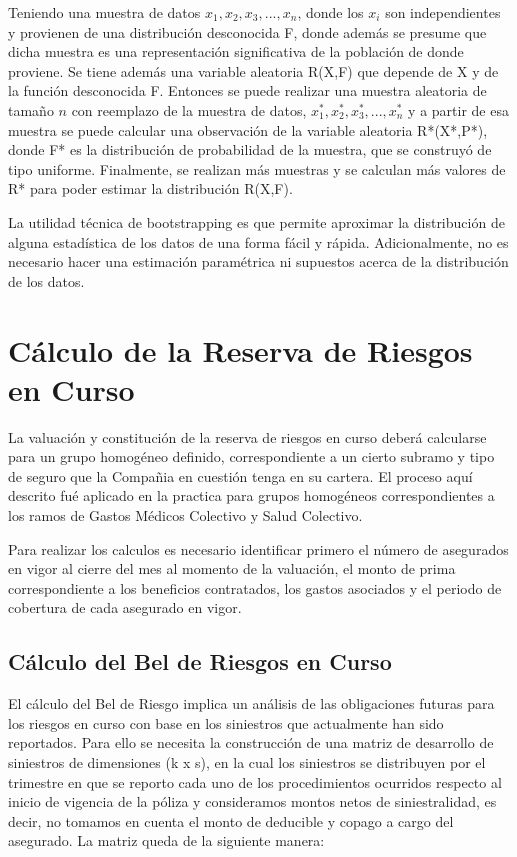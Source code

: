 \documentclass[11pt,twoside,openright,spanish]{report}
\numberwithin{equation}{chapter}
\numberwithin{figure}{chapter}
\numberwithin{table}{chapter}
\begin{document}
	Teniendo una muestra de datos $x_{1},x_{2},x_{3},...,x_{n}$, donde los $x_{i}$ son independientes y provienen de una distribución desconocida F, donde además se presume que dicha muestra es una representación significativa de la población de donde proviene. Se tiene además una variable aleatoria R(X,F) que depende de X y de la función desconocida F. Entonces se puede realizar una muestra aleatoria de tamaño $n$ con reemplazo de la muestra de datos, $x_{1}^{*},x_{2}^{*},x_{3}^{*},...,x_{n}^{*}$ y a partir de esa muestra se puede calcular una observación de la variable aleatoria R*(X*,P*), donde F* es la distribución de probabilidad de la muestra, que se construyó de tipo uniforme. Finalmente, se realizan más muestras y se calculan más valores de R* para poder estimar la distribución R(X,F).

	La utilidad técnica de bootstrapping es que permite aproximar la distribución de alguna estadística de los datos de una forma fácil y rápida. Adicionalmente, no es necesario hacer una estimación paramétrica ni supuestos acerca de la distribución de los datos.

	\chapter{Cálculo de la Reserva de Riesgos en Curso}\label{metnum}
	
	La valuación y constitución de la reserva de riesgos en curso deberá calcularse para un grupo homogéneo definido, correspondiente a un cierto subramo y tipo de seguro que la Compañia en cuestión tenga en su cartera. El proceso aquí descrito fué aplicado en la practica para grupos homogéneos correspondientes a los ramos de Gastos Médicos Colectivo y Salud Colectivo.
	
	Para realizar los calculos es necesario identificar primero el número de asegurados en vigor al cierre del mes al momento de la valuación, el monto de prima correspondiente a los beneficios contratados, los gastos asociados y el periodo de cobertura de cada asegurado en vigor.
		
	\section{Cálculo del Bel de Riesgos en Curso}

	El cálculo del Bel de Riesgo implica un análisis de las obligaciones futuras para los riesgos en curso con base en los siniestros que actualmente han sido reportados. Para ello se necesita la construcción de una matriz de desarrollo de siniestros  de dimensiones (k x s), en la cual los siniestros se distribuyen por el trimestre en que se reporto cada uno de los procedimientos ocurridos respecto al inicio de vigencia de la póliza y consideramos montos netos de siniestralidad, es decir, no tomamos en cuenta el monto de deducible y copago a cargo del asegurado. La matriz queda de la siguiente manera:
\end{document}
